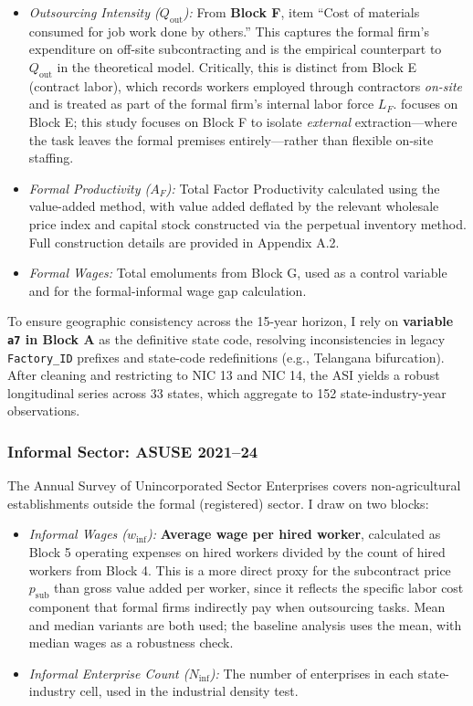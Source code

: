 \begin{itemize}
	\item \textit{Outsourcing Intensity ($Q_{\text{out}}$):} From \textbf{Block F}, item ``Cost of materials consumed for job work done by others.'' This captures the formal firm's expenditure on off-site subcontracting and is the empirical counterpart to $Q_{\text{out}}$ in the theoretical model. Critically, this is distinct from Block E (contract labor), which records workers employed through contractors \textit{on-site} and is treated as part of the formal firm's internal labor force $L_F$. \textcite{singh2023india} focuses on Block E; this study focuses on Block F to isolate \textit{external} extraction—where the task leaves the formal premises entirely—rather than flexible on-site staffing.
	
	\item \textit{Formal Productivity ($A_F$):} Total Factor Productivity calculated using the value-added method, with value added deflated by the relevant wholesale price index and capital stock constructed via the perpetual inventory method. Full construction details are provided in Appendix A.2.
	
	\item \textit{Formal Wages:} Total emoluments from Block G, used as a control variable and for the formal-informal wage gap calculation.
\end{itemize}

To ensure geographic consistency across the 15-year horizon, I rely on \textbf{variable \texttt{a7} in Block A} as the definitive state code, resolving inconsistencies in legacy \texttt{Factory\_ID} prefixes and state-code redefinitions (e.g., Telangana bifurcation). After cleaning and restricting to NIC 13 and NIC 14, the ASI yields a robust longitudinal series across 33 states, which aggregate to 152 state-industry-year observations.

\subsubsection{Informal Sector: ASUSE 2021--24}

The Annual Survey of Unincorporated Sector Enterprises covers non-agricultural establishments outside the formal (registered) sector. I draw on two blocks:

\begin{itemize}
	\item \textit{Informal Wages ($w_{\text{inf}}$):} \textbf{Average wage per hired worker}, calculated as Block 5 operating expenses on hired workers divided by the count of hired workers from Block 4. This is a more direct proxy for the subcontract price $p_{\text{sub}}$ than gross value added per worker, since it reflects the specific labor cost component that formal firms indirectly pay when outsourcing tasks. Mean and median variants are both used; the baseline analysis uses the mean, with median wages as a robustness check.
	
	\item \textit{Informal Enterprise Count ($N_{\text{inf}}$):} The number of enterprises in each state-industry cell, used in the industrial density test.
\end{itemize}

